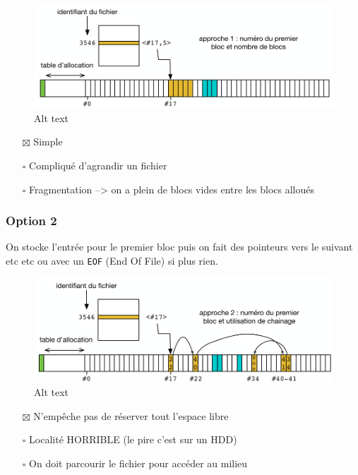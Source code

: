 \begin{figure}
\centering
\includegraphics{image-41.png}
\caption{Alt text}
\end{figure}

\begin{itemize}
\tightlist
\item[$\boxtimes$]
  Simple
\item[$\square$]
  Compliqué d'agrandir un fichier
\item[$\square$]
  Fragmentation --\textgreater{} on a plein de blocs vides entre les
  blocs alloués
\end{itemize}

\subsubsection{Option 2}\label{option-2}

On stocke l'entrée pour le premier bloc puis on fait des pointeurs vers
le suivant etc etc ou avec un \texttt{EOF} (End Of File) si plus rien.

\begin{figure}
\centering
\includegraphics{image-42.png}
\caption{Alt text}
\end{figure}

\begin{itemize}
\tightlist
\item[$\boxtimes$]
  N'empêche pas de réserver tout l'espace libre
\item[$\square$]
  Localité HORRIBLE (le pire c'est sur un HDD)
\item[$\square$]
  On doit parcourir le fichier pour accéder au milieu
\end{itemize}

